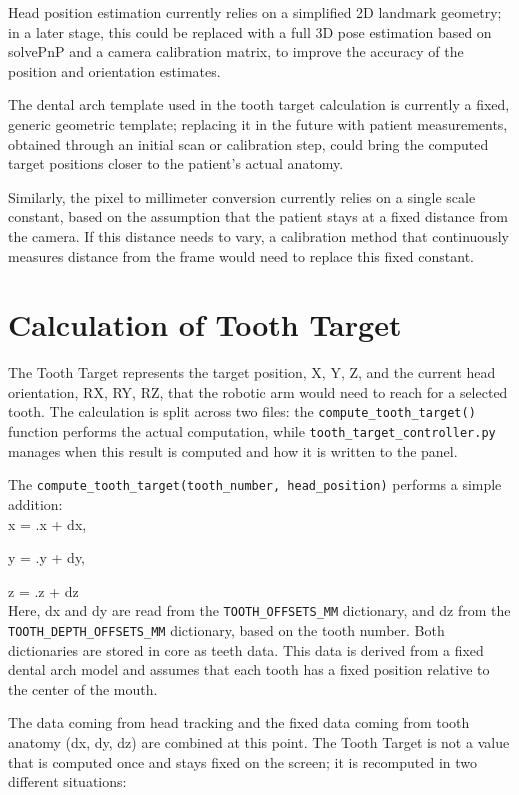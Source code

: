 Head position estimation currently relies on a simplified 2D landmark geometry; in a later stage, this could be replaced with a full 3D pose estimation based on solvePnP and a camera calibration matrix, to improve the accuracy of the position and orientation estimates.

The dental arch template used in the tooth target calculation is currently a fixed, generic geometric template; replacing it in the future with patient measurements, obtained through an initial scan or calibration step, could bring the computed target positions closer to the patient's actual anatomy.

Similarly, the pixel to millimeter conversion currently relies on a single scale constant, based on the assumption that the patient stays at a fixed distance from the camera. If this distance needs to vary, a calibration method that continuously measures distance from the frame would need to replace this fixed constant.

\section{Calculation of Tooth Target}
\label{sec:tooth_target}
The Tooth Target represents the target position, X, Y, Z, and the current head orientation, RX, RY, RZ, that the robotic arm would need to reach for a selected tooth. The calculation is split across two files: the \texttt{compute\_tooth\_target()} function performs the actual computation, while \texttt{tooth\_target\_controller.py} manages when this result is computed and how it is written to the panel.

The \texttt{compute\_tooth\_target(tooth\_number, head\_position)} performs a simple addition: \\

  x = .x + dx,

  y = .y + dy,

  z = .z + dz
\\

Here, dx and dy are read from the \texttt{TOOTH\_OFFSETS\_MM} dictionary, and dz from the \texttt{TOOTH\_DEPTH\_OFFSETS\_MM} dictionary, based on the tooth number. Both dictionaries are stored in core as teeth data. This data is derived from a fixed dental arch model and assumes that each tooth has a fixed position relative to the center of the mouth.

The data coming from head tracking and the fixed data coming from tooth anatomy (dx, dy, dz) are combined at this point. The Tooth Target is not a value that is computed once and stays fixed on the screen; it is recomputed in two different situations:

